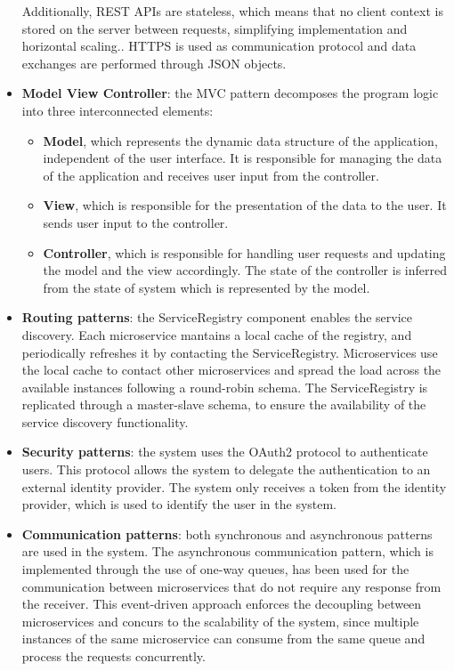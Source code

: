 \begin{itemize}
    Additionally, REST APIs are stateless, which means that no client context is stored on the server between requests, simplifying implementation and horizontal scaling.. HTTPS is used as communication protocol and data exchanges are performed through JSON objects.
    \item \textbf{Model View Controller}: the MVC pattern decomposes the program logic into three interconnected elements:
    \begin{itemize}
        \item \textbf{Model}, which represents the dynamic data structure of the application, independent of the user interface. It is responsible for managing the data of the application and receives user input from the controller.
        \item \textbf{View}, which is responsible for the presentation of the data to the user. It sends user input to the controller.
        \item \textbf{Controller}, which is responsible for handling user requests and updating the model and the view accordingly. The state of the controller is inferred from the state of system which is represented by the model.
    \end{itemize}
    \item \textbf{Routing patterns}: the ServiceRegistry component enables the service discovery. Each microservice mantains a local cache of the registry, and periodically refreshes it by contacting the ServiceRegistry.
    Microservices use the local cache to contact other microservices and spread the load across the available instances following a round-robin schema.
    The ServiceRegistry is replicated through a master-slave schema, to ensure the availability of the service discovery functionality.
    \item \textbf{Security patterns}: the system uses the OAuth2 protocol to authenticate users. This protocol allows the system to delegate the authentication to an external identity provider. The system only receives a token from the identity provider, which is used to identify the user in the system.
    \item \textbf{Communication patterns}: both synchronous and asynchronous patterns are used in the system. The asynchronous communication pattern, which is implemented through the use of one-way queues, has been used for the communication between microservices that do not require any response from the receiver.
    This event-driven approach enforces the decoupling between microservices and concurs to the scalability of the system, since multiple instances of the same microservice can consume from the same queue and process the requests concurrently.

\end{itemize}
